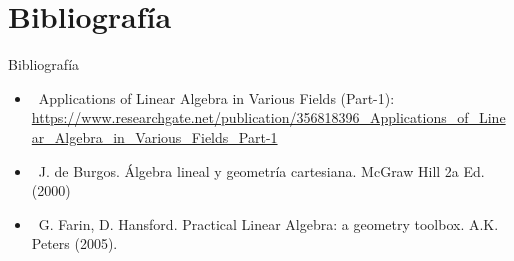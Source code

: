 \documentclass[xcolor={dvipsnames},aspectratio=169,10pt]{beamer}
\begin{document}
\section{Bibliografía}

\begin{frame}{Bibliografía}
  \begin{itemize}
    \item \faGlobe\, Applications of Linear Algebra in Various Fields (Part-1): \url{https://www.researchgate.net/publication/356818396_Applications_of_Linear_Algebra_in_Various_Fields_Part-1}
    \item \faBook\, J. de Burgos. Álgebra lineal y geometría cartesiana. McGraw Hill 2a Ed. (2000)
    \item \faBook\, G. Farin, D. Hansford. Practical Linear Algebra: a geometry toolbox. A.K. Peters (2005).
  \end{itemize}
\end{frame}

\end{document}
